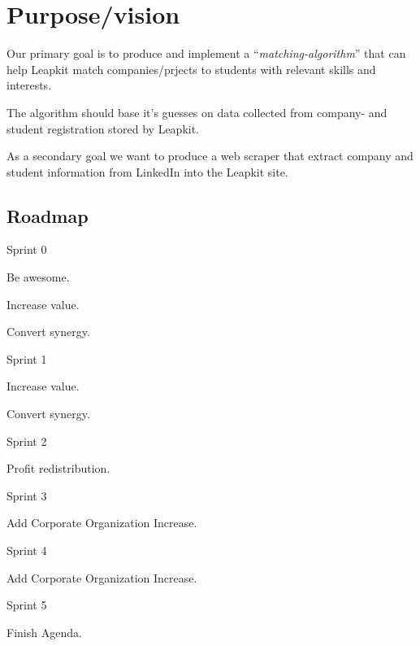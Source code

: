 \section{Purpose/vision}

Our primary goal is to produce and implement a ``\emph{matching-algorithm}'' that can help
Leapkit match companies/prjects to students with relevant skills and interests.

The algorithm should base it's guesses on data collected from company- and student registration stored by Leapkit.

As a secondary goal we want to produce a web scraper that extract company and student information from LinkedIn into the Leapkit site.

\subsection{Roadmap}

\begin{enumerate*}
  \item Sprint 0 \\
        \begin{enumerate*}
          \item Be awesome.
          \item Increase value.
          \item Convert synergy.
        \end{enumerate*}
  \item Sprint 1 \\
        \begin{enumerate*}
          \item Increase value.
          \item Convert synergy.
        \end{enumerate*}
  \item Sprint 2 \\
        \begin{enumerate*}
          \item Profit redistribution.
        \end{enumerate*}
  \item Sprint 3 \\
        \begin{enumerate*}
          \item Add Corporate Organization Increase.
        \end{enumerate*}
  \item Sprint 4 \\
        \begin{enumerate*}
          \item Add Corporate Organization Increase.
        \end{enumerate*}
  \item Sprint 5 \\
        \begin{enumerate*}
          \item Finish Agenda.
        \end{enumerate*}
\end{enumerate*}
